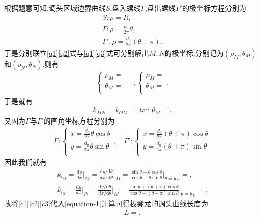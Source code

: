 \documentclass[lang=cn,newtx,10pt,scheme=chinese]{../Template/elegantbook}
\begin{document}
根据题意可知,调头区域边界曲线$S$,盘入螺线$\varGamma$,盘出螺线$\varGamma'$的极坐标方程分别为
\begin{gather}
S:\rho =R,\label{q1}
\\
\varGamma:\rho =\frac{d_0}{2\pi}\theta ,\label{q2}
\\
\varGamma':\rho =\frac{d_0}{2\pi}\left( \theta +\pi \right) .\label{q3}
\end{gather}
于是分别联立\eqref{q1}\eqref{q2}式与\eqref{q1}\eqref{q3}式可分别解出$M,N$的极坐标,分别记为$(\rho_M,\theta_M)$和$(\rho_N,\theta_N)$,则有
\begin{gather}\label{14564}
\begin{cases}
\rho _M=\\
\theta _M=\\
\end{cases}
\quad,
\begin{cases}
\rho _M=\\
\theta _M=\\
\end{cases}.
\end{gather}
于是就有
\begin{align}
k_{MN}=k_{OM}=\tan \theta _M=.\label{c1}
\end{align}
又因为$\varGamma$与$\varGamma'$的直角坐标方程分别为
\begin{align}
\varGamma :\begin{cases}
x=\frac{d_0}{2\pi}\theta \cos \theta\\
y=\frac{d_0}{2\pi}\theta \sin \theta\\
\end{cases},\quad \varGamma ' :\begin{cases}
x=\frac{d_0}{2\pi}\left( \theta +\pi \right) \cos \theta\\
y=\frac{d_0}{2\pi}\left( \theta +\pi \right) \sin \theta\\
\end{cases}
\end{align}
因此我们就有
\begin{gather}
k_{l_M}=\frac{\mathrm{d}y}{dx}\Big |_{M}^{}=\frac{\mathrm{d}y/\mathrm{d}\theta}{dx/\mathrm{d}\theta}\Big |_{M}^{}=\frac{\sin \theta +\theta \cos \theta}{\cos \theta -\theta \sin \theta}\Big |_{\theta =\theta _M}^{}=,\label{c2}
\\
k_{l_N}=\frac{\mathrm{d}y}{dx}\Big |_{N}^{}=\frac{\mathrm{d}y/\mathrm{d}\theta}{dx/\mathrm{d}\theta}\Big |_{M}^{}=\frac{\sin \theta +\left( \theta +\pi \right) \cos \theta}{\cos \theta -\left( \theta +\pi \right) \sin \theta}\Big |_{\theta =\theta _N}^{}=.\label{c3}
\end{gather}
故将\eqref{c1}\eqref{c2}\eqref{c3}代入\eqref{equation-1}计算可得板凳龙的调头曲线长度为
\begin{align}
L=.
\end{align}
\end{document}
